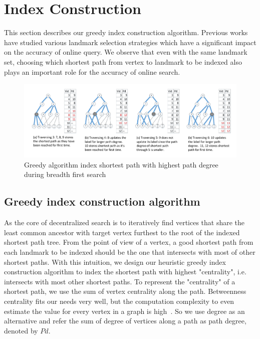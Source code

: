 \section{Index Construction}
\label{preprocessing}

This section describes our greedy index construction algorithm. Previous works have studied various landmark selection strategies which have a significant impact on the accuracy of online query. We observe that even with the same landmark set, choosing which shortest path from vertex to landmark to be indexed also plays an important role for the accuracy of online search. 

\begin{figure}[ht]
    \centering
    \includegraphics[width=\linewidth]{./figures/new_illustrate/bfs_illustrate.pdf}
    \caption{Greedy algorithm index shortest path with highest path degree during breadth first search}
    \label{fig:bfs_illustrate}
\end{figure}

\subsection{Greedy index construction algorithm}
As the core of decentralized search is to iteratively find vertices that share the least common ancestor with target vertex furthest to the root of the indexed shortest path tree. From the point of view of a vertex, a good shortest path from each landmark to be indexed should be the one that intersects with most of other shortest paths. With this intuition, we design our heuristic greedy index construction algorithm to index the shortest path with highest "centrality", i.e. intersects with most other shortest paths. To represent the "centrality" of a shortest path, we use the sum of vertex centrality along the path. Betweenness centrality fits our needs very well, but the computation complexity to even estimate the value for every vertex in a graph is high~\cite{Riondato:2014:FAB:2556195.2556224}. So we use degree as an alternative and refer the sum of degree of vertices along a path as path degree, denoted by $Pd$.


